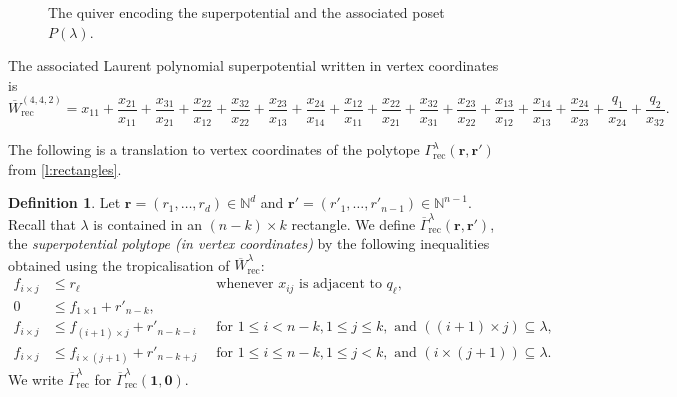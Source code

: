 \documentclass{amsart}
\theoremstyle{definition}
\newtheorem{definition}[thm]{Definition}
\numberwithin{equation}{section}
\newcommand{\rr}{\mathbf r}
\newcommand{\rect}{\mathrm{rec}}
\newcommand{\rW}{\overline{W}}
\newcommand{\rGamma}{\overline{\Gamma}}
\begin{document}
\begin{figure}[h]
\begin{center}
\caption{The quiver 
encoding the superpotential
and the associated poset $P(\lambda)$.}
\label{fig:superpotential-442}
\end{center}
\end{figure}

The associated Laurent polynomial superpotential written in
vertex coordinates is
\begin{equation}\label{eq:442}
	\rW_{\rect}^{(4,4,2)}=x_{11}+\frac{x_{21}}{x_{11}}+\frac{x_{31}}{x_{21}}+\frac{x_{22}}{x_{12}}+\frac{x_{32}}{x_{22}}+\frac{x_{23}}{x_{13}}+\frac{x_{24}}{x_{14}}+\frac{x_{12}}{x_{11}}+\frac{x_{22}}{x_{21}}+\frac{x_{32}}{x_{31}}+\frac{x_{23}}{x_{22}}+\frac{x_{13}}{x_{12}}+
	\frac{x_{14}}{x_{13}}+\frac{x_{24}}{x_{23}}+\frac{q_{1}}{x_{24}}+\frac{q_{2}}{x_{32}}.
\end{equation}



The following is a translation to vertex coordinates of the polytope $\Gamma_\rect^\lambda(\mathbf r,\mathbf r')$ from \cref{l:rectangles}.

\begin{definition}\label{def:super2}
Let $\rr=(r_1,\dots,r_d)\in \mathbb{N}^d$
and $\rr'=(r'_1,\dots,r'_{n-1})\in \mathbb{N}^{n-1}$.
Recall that $\lambda$ is contained in an $(n-k) \times k$ rectangle.
We define $\rGamma_{\rect}^\lambda(\rr,\rr')$, the \emph{superpotential polytope (in vertex coordinates)}
 by the following inequalities obtained using the tropicalisation of $\rW_{\rect}^{\lambda}$:
 \[
\begin{array}{cll}
	f_{i \times j}  & \leq r_{\ell} &\text{ whenever } x_{ij}
	\text{ is adjacent to }q_\ell,  \\
	0 & \leq f_{1 \times 1} +r'_{n-k}, & \\
	f_{i \times j} &\leq
	f_{(i+1) \times j} + r'_{n-k-i}
	\ &\text{ for } 1\leq i<n-k,
		1 \leq j\leq k, \text{ and } ((i+1) \times j) \subseteq \lambda, \\
	f_{i \times j} &\leq
	f_{i \times (j+1)} +r'_{n-k+j}
	\ &\text{ for }1 \leq i \leq n-k,
		1\leq j <k, \text{ and } (i \times (j+1)) \subseteq \lambda. 
        \end{array}      
\]
	We write $\overline{\Gamma}_{\rect}^{\lambda}$ for 
	$\rGamma_{\rect}^\lambda(\mathbf{1},\mathbf{0})$.
\end{definition}
\end{document}

